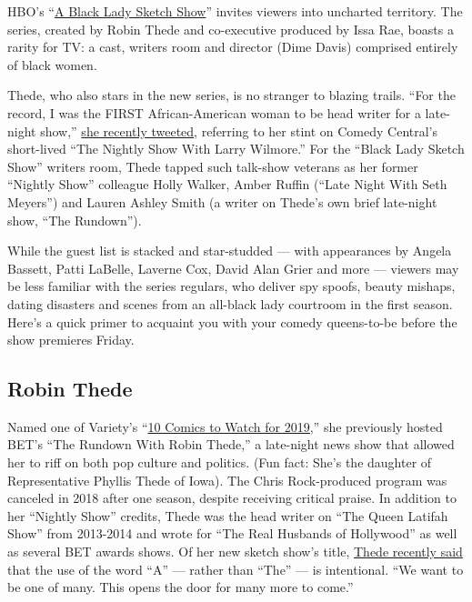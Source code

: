 HBO's ``\href{https://www.youtube.com/watch?v=EPBi9ttKbeU}{A Black Lady
Sketch Show}'' invites viewers into uncharted territory. The series,
created by Robin Thede and co-executive produced by Issa Rae, boasts a
rarity for TV: a cast, writers room and director (Dime Davis) comprised
entirely of black women.

Thede, who also stars in the new series, is no stranger to blazing
trails. ``For the record, I was the FIRST African-American woman to be
head writer for a late-night show,''
\href{https://twitter.com/robinthede/status/1148700355737161729}{she
recently tweeted}, referring to her stint on Comedy Central's
short-lived ``The Nightly Show With Larry Wilmore.'' For the ``Black
Lady Sketch Show'' writers room, Thede tapped such talk-show veterans as
her former ``Nightly Show'' colleague Holly Walker, Amber Ruffin (``Late
Night With Seth Meyers'') and Lauren Ashley Smith (a writer on Thede's
own brief late-night show, ``The Rundown'').

While the guest list is stacked and star-studded --- with appearances by
Angela Bassett, Patti LaBelle, Laverne Cox, David Alan Grier and more
--- viewers may be less familiar with the series regulars, who deliver
spy spoofs, beauty mishaps, dating disasters and scenes from an
all-black lady courtroom in the first season. Here's a quick primer to
acquaint you with your comedy queens-to-be before the show premieres
Friday.

\hypertarget{robin-thede}{%
\subsection{Robin Thede}\label{robin-thede}}

Named one of Variety's
``\href{https://variety.com/2019/legit/features/10-comics-to-watch-2019-variety-1203242713/}{10
Comics to Watch for 2019,}'' she previously hosted BET's ``The Rundown
With Robin Thede,'' a late-night news show that allowed her to riff on
both pop culture and politics. (Fun fact: She's the daughter of
Representative Phyllis Thede of Iowa). The Chris Rock-produced program
was canceled in 2018 after one season, despite receiving critical
praise. In addition to her ``Nightly Show'' credits, Thede was the head
writer on ``The Queen Latifah Show'' from 2013-2014 and wrote for ``The
Real Husbands of Hollywood'' as well as several BET awards shows. Of her
new sketch show's title,
\href{https://www.hbo.com/a-black-lady-sketch-show/a-black-lady-sketch-show-essence-fest-coverage}{Thede
recently said} that the use of the word ``A'' --- rather than ``The''
--- is intentional. ``We want to be one of many. This opens the door for
many more to come.''

